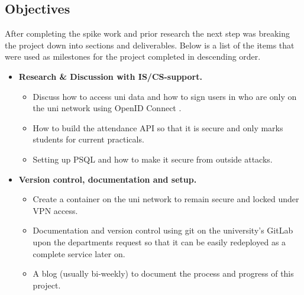 \subsection{Objectives}\label{sec1:obj}
After completing the spike work and prior research the next step was breaking the project down into sections and deliverables. Below is a list of the items that were used as milestones for the project completed in descending order.

\begin{itemize}
	\item \textbf{Research \& Discussion with IS/CS-support.}
	\begin{itemize}
		\item Discuss how to access uni data and how to sign users in who are only on the uni network using OpenID Connect \cite{OpenID}.
		\item How to build the attendance API so that it is secure and only marks students for current practicals.
		\item Setting up PSQL \cite{psql} and how to make it secure from outside attacks.
	\end{itemize}
	
	\item \textbf{Version control, documentation and setup.}
	\begin{itemize}
		\item Create a container on the uni network to remain secure and locked under VPN access.
		\item Documentation and version control using git on the university's GitLab upon the departments request so that it can be easily redeployed as a complete service later on.
		\item A blog (usually bi-weekly) to document the process and progress of this project.
	\end{itemize}
	

\end{itemize}
